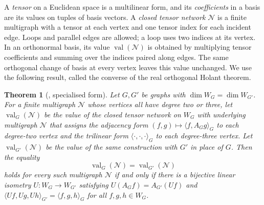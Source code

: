 \documentclass[10pt,a4paper]{article}
\theoremstyle{plain}
\newtheorem*{theorem*}{Theorem}
\theoremstyle{definition}
\DeclareMathOperator{\val}{val}
\begin{document}
A \emph{tensor} on a Euclidean space is a multilinear form, and its
\emph{coefficients} in a basis are its values on tuples of basis
vectors.
A \emph{closed tensor network} $\mathcal N$ is a finite multigraph with a tensor at
each vertex and one tensor index for each incident edge.
Loops and parallel edges are allowed; a loop uses two indices at its vertex.
In an orthonormal basis, its value $\val(\mathcal N)$ is obtained by multiplying
tensor coefficients and summing over the indices paired along edges.
The same orthogonal change of basis at every vertex leaves this value unchanged.
We use the following result, called the converse of the real orthogonal
Holant theorem.
\begin{theorem*}[{\cite[Theorem~9]{Young2025}, specialised form}]
Let $G,G'$ be graphs with $\dim W_G=\dim W_{G'}$.
For a finite multigraph $\mathcal N$ whose vertices all have degree two or
three, let $\val_G(\mathcal N)$ be the value of the closed tensor network
on $W_G$ with underlying multigraph $\mathcal N$ that assigns the adjacency form
$(f,g)\mapsto\langle f,A_Gg\rangle_G$ to each degree-two vertex and
the trilinear form $\langle\cdot,\cdot,\cdot\rangle_G$ to each
degree-three vertex. Let $\val_{G'}(\mathcal N)$ be the value of the same
construction with $G'$ in place of $G$.
Then the equality
\begin{equation}\label{eq:image-all-networks}
 \val_G(\mathcal N)=\val_{G'}(\mathcal N)
\end{equation}
holds for every such multigraph $\mathcal N$ if and only if there is a bijective
linear isometry $U:W_G\to W_{G'}$ satisfying $U(A_Gf)=A_{G'}(Uf)$ and
$\langle Uf,Ug,Uh\rangle_{G'}=\langle f,g,h\rangle_G$ for all $f,g,h\in W_G$.
\end{theorem*}
\end{document}
